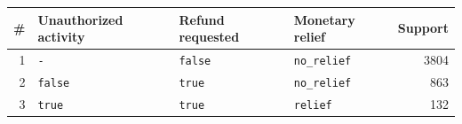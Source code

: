 \begin{tabular}{@{}rlllr@{}}
\toprule
\# & Unauthorized activity & Refund requested & Monetary relief & Support \\
\midrule
1 & \texttt{-} & \texttt{false} & \texttt{no\_relief} & 3804 \\
2 & \texttt{false} & \texttt{true} & \texttt{no\_relief} & 863 \\
3 & \texttt{true} & \texttt{true} & \texttt{relief} & 132 \\
\bottomrule
\end{tabular}
